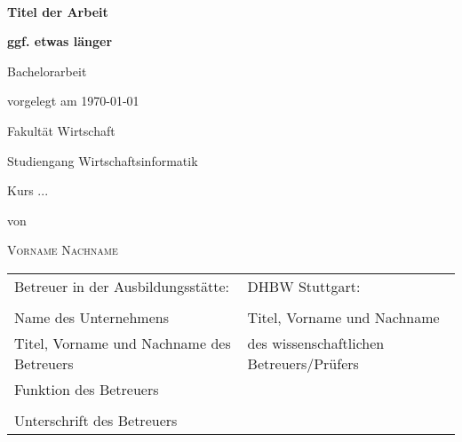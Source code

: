 \newcommand{\typMeinerArbeit}{Bachelorarbeit} 

\newcommand{\themaMeinerArbeit}{Mein Titel}

\thispagestyle{empty}

\begin{spacing}{1}
\begin{center}	
~\vspace{0mm}

{\sffamily
\LARGE  
\textbf{Titel der Arbeit}

\bigskip
\textbf{ggf. etwas länger}
}


\vspace{15mm}

{\Large \typMeinerArbeit}

\vspace{1cm}

vorgelegt am \today 

\vspace{15mm}

Fakultät Wirtschaft
\medskip

Studiengang Wirtschaftsinformatik
\medskip

Kurs ... 

\vspace{10mm}

von

\vspace{10mm}

{\large\textsc{Vorname Nachname}}

\vspace{10mm}
\end{center}

\vfill

\begin{tabular}{ll}
Betreuer in der Ausbildungsstätte: & DHBW Stuttgart: \\
\hspace{0.4\linewidth} & \\
Name des Unternehmens & Titel, Vorname und Nachname \\
Titel, Vorname und Nachname des Betreuers 
& des wissenschaftlichen Betreuers/Prüfers \\
Funktion des Betreuers \\
\\
Unterschrift des Betreuers \\
\end{tabular}


\vspace{1cm}
\end{spacing}

